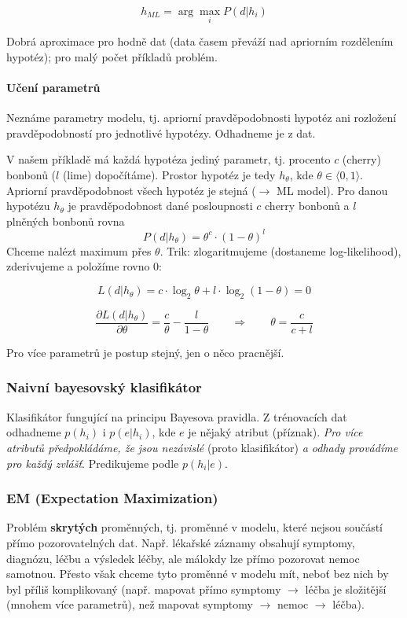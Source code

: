 \documentclass[11pt]{report} %
\numberwithin{equation}{section}
\begin{document}
$$h_{ML} = \arg\max_i P(d|h_i)$$

Dobrá aproximace pro hodně dat (data časem převáží nad apriorním rozdělením hypotéz); pro malý počet příkladů problém.

\paragraph{Učení parametrů}
Neznáme parametry modelu, tj. apriorní pravděpodobnosti hypotéz ani rozložení pravděpodobností pro jednotlivé hypotézy. Odhadneme je z dat.

V našem příkladě má každá hypotéza jediný parametr, tj. procento $c$ (cherry) bonbonů ($l$ (lime) dopočítáme). Prostor hypotéz je tedy $h_\theta$, kde $\theta \in \langle 0,1 \rangle$. Apriorní pravděpodobnost všech hypotéz je stejná ($\to$ ML model). Pro danou hypotézu $h_\theta$ je pravděpodobnost dané posloupnosti $c$ cherry bonbonů a $l$ plněných bonbonů rovna
$$P(d|h_\theta) = \theta^c \cdot (1-\theta)^l$$
Chceme nalézt maximum přes $\theta$. Trik: zlogaritmujeme (dostaneme log-likelihood), zderivujeme a položíme rovno 0:

$$L(d|h_\theta) = c\cdot \log_2\theta + l\cdot\log_2(1-\theta) = 0$$

$$\frac{\partial L(d|h_\theta)}{\partial \theta} = \frac{c}{\theta} - \frac{l}{1-\theta}
\qquad \Rightarrow \qquad
\theta = \frac{c}{c+l}$$

Pro více parametrů je postup stejný, jen o něco pracnější.


\subsubsection{Naivní bayesovský klasifikátor}
Klasifikátor fungující na principu Bayesova pravidla. Z trénovacích dat odhadneme $p(h_i)$ i $p(e|h_i)$, kde $e$ je nějaký atribut (příznak). \textit{Pro více atributů předpokládáme, že jsou nezávislé} (proto  klasifikátor) \textit{a odhady provádíme pro každý zvlášť}. Predikujeme podle $p(h_i|e)$. 


\subsubsection{EM (Expectation Maximization)}
Problém \textbf{skrytých} proměnných, tj. proměnné v modelu, které nejsou součástí přímo pozorovatelných dat. Např. lékařské záznamy obsahují symptomy, diagnózu, léčbu a výsledek léčby, ale málokdy lze přímo pozorovat nemoc samotnou. Přesto však chceme tyto proměnné v modelu mít, neboť bez nich by byl příliš komplikovaný (např. mapovat přímo symptomy $\to$ léčba je složitější (mnohem více parametrů), než mapovat symptomy $\to$ nemoc $\to$ léčba). 
\end{document}
